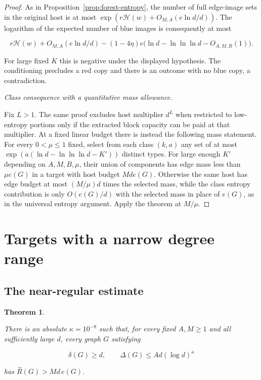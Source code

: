 \documentclass[11pt]{amsart}
\newtheorem{theorem}{Theorem}[section]
\theoremstyle{definition}
\theoremstyle{remark}
\numberwithin{equation}{section}
\begin{document}
\begin{proof}
As in Proposition~\ref{prop:forest-entropy}, the number of full edge-image sets in the original host is at most $\exp(r\mathcal H(w)+O_{M,A}(e\ln d/d))$. The logarithm of the expected number of blue images is consequently at most

\begin{equation}
r\mathcal H(w)+O_{M,A}(e\ln d/d)
-(1-4\eta)e\bigl(\ln d-\ln\ln\ln d-O_{A,M,B}(1)\bigr).
\end{equation}

For large fixed $K$ this is negative under the displayed hypothesis. The conditioning precludes a red copy and there is an outcome with no blue copy, a contradiction.

\medskip\noindent\emph{Class consequence with a quantitative mass allowance.}

Fix $L>1$. The same proof excludes host multiplier $ d^L $ when restricted to low-entropy portions only if the extracted block capacity can be paid at that multiplier. At a fixed linear budget there is instead the following mass statement. For every $0<\mu\le1$ fixed, select from each class $(k,a)$ any set of at most $\exp(a(\ln d-\ln\ln\ln d-K'))$ distinct types. For large enough $ K'$ depending on $ A,M,B,\mu $, their union of components has edge mass less than $\mu e(G)$ in a target with host budget $ Md e(G)$. Otherwise the same host has edge budget at most $(M/\mu)d $ times the selected mass, while the class entropy contribution is only $ O(e(G)/d)$ with the selected mass in place of $ e(G)$, as in the universal entropy argument. Apply the theorem at $ M/\mu$.

\end{proof}

\section{Targets with a narrow degree range}\label{sec:near-regular}

\subsection{The near-regular estimate}

\begin{theorem}\label{thm:near-regular}

There is an absolute $\kappa=10^{-8}$ such that, for every fixed $ A,M\ge1$ and all sufficiently large $ d $, every graph $ G$ satisfying

\begin{equation}
\delta(G)\ge d,\qquad \Delta(G)\le A d(\log d)^\kappa
\end{equation}

has $\widehat R(G)>Md\,e(G)$.

\end{theorem}
\end{document}
